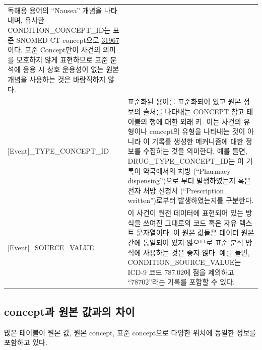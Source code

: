 \documentclass[11pt]{book}
\theoremstyle{definition}
\theoremstyle{definition}
\theoremstyle{definition}
\theoremstyle{remark}
\begin{document}
\begin{longtable}[]{@{}ll@{}}
\begin{minipage}[t]{0.60\columnwidth}
독해용 용어의 ``Nausea'' 개념을 나타내며, 유사한
CONDITION\_CONCEPT\_ID는 표준 SNOMED-CT concept으로
\href{http://athena.ohdsi.org/search-terms/terms/31967}{31967}이다. 표준
Concept만이 사건의 의미를 모호하지 않게 표현하므로 표준 분석에 응용 시
상호 운용성이 없는 원본 개념을 사용하는 것은 바람직하지 않다.\strut
\end{minipage}\tabularnewline
\begin{minipage}[t]{0.34\columnwidth}\raggedright\strut
{[}Event{]}\_TYPE\_CONCEPT\_ID\strut
\end{minipage} & \begin{minipage}[t]{0.60\columnwidth}\raggedright\strut
표준화된 용어를 표준화되어 있고 원본 정보의 출처를 나타내는 CONCEPT 참고
테이블의 행에 대한 외래 키. 이는 사건의 유형이나 concept의 유형을
나타내는 것이 아니라 이 기록를 생성한 메커니즘에 대한 정보를 수집하는
것을 의미한다. 예를 들면, DRUG\_TYPE\_CONCEPT\_ID는 이 기록이 약국에서의
처방 (``Pharmacy dispensing'')으로 부터 발생하였는지 혹은 전자 처방
신청서 (``Prescription written'')로부터 발생하였는지를 구분한다.\strut
\end{minipage}\tabularnewline
\begin{minipage}[t]{0.34\columnwidth}\raggedright\strut
{[}Event{]}\_SOURCE\_VALUE\strut
\end{minipage} & \begin{minipage}[t]{0.60\columnwidth}\raggedright\strut
이 사건이 원천 데이터에 표현되어 있는 방식을 쓰여진 그대로의 코드 혹은
자유 텍스트 문자열이다. 이 원본 값들은 데이터 원본간에 통일되어 있지
않으므로 표준 분석 방식에 사용하는 것은 좋지 않다. 예를 들면,
CONDITION\_SOURCE\_VALUE는 ICD-9 코드 787.02에 점을 제외하고
``78702''라는 기록를 포함할 수 있다.\strut
\end{minipage}\tabularnewline
\bottomrule
\end{longtable}

\subsection{concept과 원본 값과의 차이}\label{concepts-Sources}

많은 테이블이 원본 값, 원본 concept, 표준 concept으로 다양한 위치에
동일한 정보를 포함하고 있다.
\end{document}
